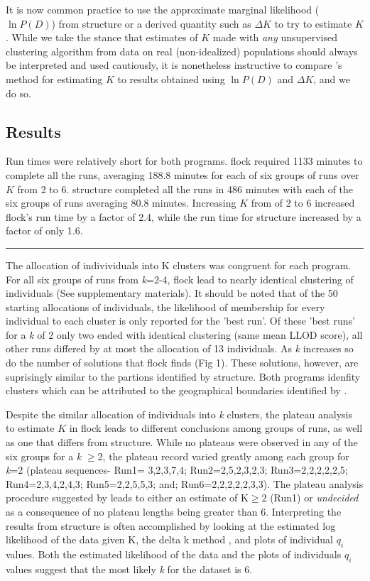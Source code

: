 It is now common practice to use the approximate marginal likelihood ($\ln P(D)$) from {\sc structure}
or a derived quantity such as $\Delta K$ \citep{Evannoetal2005} to try to estimate $K$.
While we take the stance that estimates of $K$ made with {\em any} unsupervised clustering algorithm
from data on real (non-idealized) populations should always be interpreted and used
cautiously, it is nonetheless instructive to compare \citet{Duc&Tur2012}'s method for
estimating $K$ to results obtained using $\ln P(D)$ and $\Delta K$, and we do so. 


\subsection*{Results} 
Run times were relatively short for both programs. {\sc flock} 
required 1133 minutes to complete all the runs, averaging 188.8 minutes for 
each of six groups of runs over $K$ from 2 to 6. {\sc structure} completed all the runs in 
486 minutes with each of the six groups of runs averaging 80.8 minutes. Increasing
$K$ from of 2 to 6 increased {\sc flock}'s run time by a factor of 2.4, while the run time 
for  {\sc structure} increased by a factor of only 1.6.  
\hrule

The allocation of indivividuals into K clusters was congruent for each program. For all six groups 
of runs from \textit{k}=2-4, {\sc flock} lead to nearly identical clustering of individuals 
(See supplementary materials). It should be noted
that of the 50 starting allocations of individuals, the likelihood of membership for every individual 
to each cluster is only reported for the 'best run'. Of these 'best runs' for a \textit{k} of 2 only two  
ended with identical clustering (same mean LLOD score), all other runs 
differed by at most the allocation of 13 individuals. As \textit{k} increases so do the number of solutions
that {\sc flock} finds (Fig 1). These solutions, however, are suprisingly similar to
 the partions identified by {\sc structure}. Both programs idenfity clusters 
which can be attributed to the geographical boundaries identified by \citet{Garzaetal_norcal}.

Despite the similar allocation of individuals into \textit{k} clusters, the 
plateau analysis to estimate $K$ in {\sc flock} leads to different conclusions among groups of runs, as well as 
one that differs from {\sc structure}. While no plateaus were observed in any of the six groups 
for a \textit{k} $\geq$2, the plateau record varied greatly among each
 group for \textit{k}=2 (plateau  sequences- Run1= 3,2,3,7,4; Run2=2,5,2,3,2,3; Run3=2,2,2,2,2,5; 
Run4=2,3,4,2,4,3; Run5=2,2,5,5,3; and; Run6=2,2,2,2,2,3,3). The plateau analysis 
procedure suggested by \citet{Duc&Tur2012} leads to 
either an estimate of K$\geq$2 (Run1) or \textit{undecided} as a consequence of no plateau 
lengths being greater than 6. Interpreting the results from {\sc structure} is often accomplished by 
looking at the estimated log likelihood of the data given K, the delta k method \citep{Evannoetal2005}, and plots of 
individual \textit{$q_i$} values. Both the estimated likelihood of the data
and the plots of individuals \textit{$q_i$} values suggest that 
the most likely \textit{k} for the dataset is 6. 

